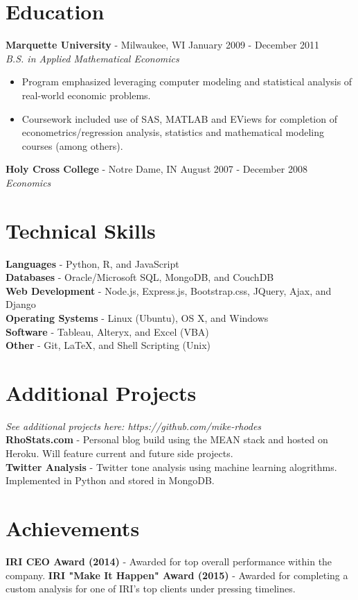 \documentclass[margin]{res}
\begin{document}
\begin{resume}
\section{Education} 
\textbf{Marquette University} - Milwaukee, WI \hfill January 2009 - December 2011 \\
\textit{B.S. in Applied Mathematical Economics}

\begin{itemize} \itemsep -2pt  %
	\item Program emphasized leveraging computer modeling and statistical analysis of real-world economic problems.
 	\item Coursework included use of SAS, MATLAB and EViews for completion of econometrics/regression analysis, statistics and mathematical modeling courses (among others).
\end{itemize}

\textbf{Holy Cross College} - Notre Dame, IN \hfill August 2007 - December 2008 \\
\textit{Economics}

\section{Technical Skills}
    {\bf Languages} - Python, R, and JavaScript\\
	{\bf Databases} - Oracle/Microsoft SQL, MongoDB, and CouchDB\\
	{\bf Web Development} - Node.js, Express.js, Bootstrap.css, JQuery, Ajax, and Django\\
	{\bf Operating Systems} - Linux (Ubuntu), OS X, and Windows\\
    {\bf Software} - Tableau, Alteryx, and Excel (VBA)\\
    {\bf Other} - Git, {\LaTeX}, and Shell Scripting (Unix)

\section{Additional Projects} \hfill \textit{See additional projects here: https://github.com/mike-rhodes}\\
	{\bf RhoStats.com} - Personal blog build using the MEAN stack and hosted on Heroku. Will feature current and future side projects.\\
	{\bf Twitter Analysis} - Twitter tone analysis using machine learning alogrithms. Implemented in Python and stored in MongoDB.

\section{Achievements}
    {\bf IRI CEO Award (2014)} - Awarded for top overall performance within the company.
	{\bf IRI "Make It Happen" Award (2015)} - Awarded for completing a custom analysis for one of IRI's top clients under pressing timelines.
	
\end{resume}
\end{document}
